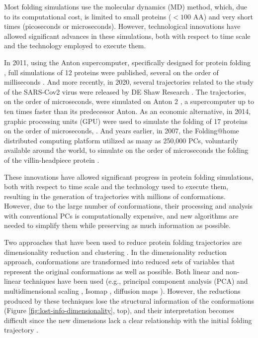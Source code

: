 \documentclass[twocolumn]{bmcart}%
\begin{document}
Most folding simulations use the molecular dynamics (MD) method, which, due to its computational cost, is limited to small proteins ($<100$ AA) and very short times (picoseconds or microseconds). However, technological innovations have allowed significant advances in these simulations, both with respect to time scale and the technology employed to execute them.

In 2011, using the Anton supercomputer, specifically designed for protein folding \cite{Shaw2008}, full simulations of 12 proteins were published, several on the order of milliseconds \cite{Shaw2011}. And more recently, in 2020, several trajectories related to the study of the SARS-Cov2 virus were released by DE Shaw Research \cite{Shaw2020}. The trajectories, on the order of microseconds, were simulated on Anton 2 \cite{Shaw2014}, a supercomputer up to ten times faster than its predecessor Anton. As an economic alternative, in 2014, graphic processing units (GPU) were used to simulate the folding of 17 proteins on the order of microseconds, \cite{Nguyen2014}. And years earlier, in 2007, the Folding@home distributed computing platform utilized as many as 250,000 PCs, voluntarily available around the world, to simulate on the order of microseconds the folding of the villin-headpiece protein \cite{Larson2009}.

These innovations have allowed significant progress in protein folding simulations, both with respect to time scale and the technology used to execute them, resulting in the generation of trajectories with millions of conformations. However, due to the large number of conformations, their processing and analysis with conventional PCs is computationally expensive, and new algorithms are needed to simplify them while preserving as much information as possible.

Two approaches that have been used to reduce protein folding trajectories are dimensionality reduction \cite{Duan2013} and clustering \cite{Peng2018}. In the dimensionality reduction approach, conformations are transformed into reduced sets of variables that represent the original conformations as well as possible. Both linear and non-linear techniques have been used (e.g., principal component analysis (PCA) and multidimensional scaling \cite{RajanSchulten10}, Isomap \cite{Das2006}, diffusion maps \cite{Kim2015}). However, the reductions produced by these techniques lose the structural information of the conformations (Figure \ref{fig:lost-info-dimensionality}, top), and their interpretation becomes difficult since the new dimensions lack a clear relationship with the initial folding trajectory \cite{Cavallo2018}.
\end{document}
